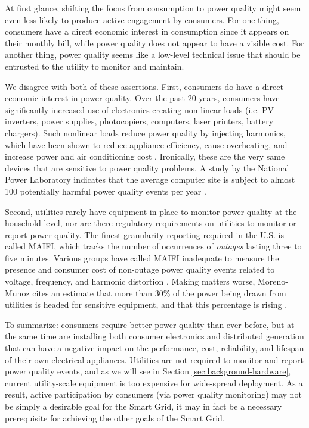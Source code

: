 
At first glance, shifting the focus from consumption to power quality might seem even less likely to produce active engagement by consumers. For one thing, consumers have a direct economic interest in consumption since it appears on their monthly bill, while power quality does not appear to have a visible cost.  For another thing, power quality seems like a low-level technical issue that should be entrusted to the utility to monitor and maintain. 

We disagree with both of these assertions. First, consumers do have a direct economic interest in power quality. Over the past 20 years, consumers have significantly increased use of electronics creating non-linear loads (i.e. PV inverters, power supplies, photocopiers, computers, laser printers, battery chargers). Such nonlinear loads reduce power quality by injecting harmonics, which have been shown to reduce appliance efficiency, cause overheating, and increase power and air conditioning cost \cite{Rodriguez2010}. Ironically, these are the very same devices that are sensitive to power quality problems. A study by the National Power Laboratory indicates that the average computer site is subject to almost 100 potentially harmful power quality events per year \cite{Dorr1992}.

Second, utilities rarely have equipment in place to monitor power quality at the household level, nor are there regulatory requirements on utilities to monitor or report power quality. The finest granularity reporting required in the U.S. is called MAIFI, which tracks the number of occurrences of {\em outages} lasting three to five minutes. Various groups have called MAIFI inadequate to measure the presence and consumer cost of non-outage power quality events related to voltage, frequency, and harmonic distortion \cite{Rouse2011,LaCommare2004,Eto2008}. Making matters worse, Moreno-Munoz cites an estimate that more than 30\% of the power being drawn from utilities is headed for sensitive equipment, and that this percentage is rising \cite{Moreno-Munoz2007}. 

To summarize: consumers require better power quality than ever before, but at the same time are installing both consumer electronics and distributed generation that can have a negative impact on the performance, cost, reliability, and lifespan of their own electrical appliances. Utilities are not required to monitor and report power quality events, and as we will see in Section \ref{sec:background-hardware}, current utility-scale equipment is too expensive for wide-spread deployment. As a result, active participation by consumers (via power quality monitoring) may not be simply a desirable goal for the Smart Grid, it may in fact be a necessary prerequisite for achieving the other goals of the Smart Grid. 

